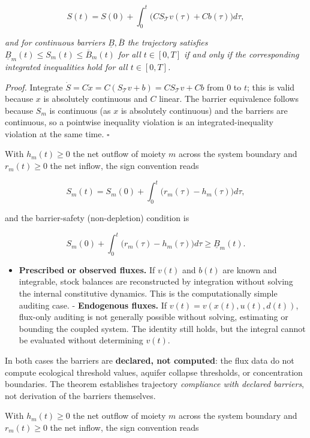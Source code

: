 \documentclass[11pt]{article}
\begin{document}
$$S(t) = S(0) + \int_0^t \bigl( C S_{\mathcal{T}} v(\tau) + Cb(\tau) \bigr) d\tau,$$

 \emph{and for continuous barriers \(\underline{B}, \overline{B}\) the trajectory satisfies \(\underline{B}_m(t) \le S_m(t) \le \overline{B}_m(t)\) for all \(t \in [0,T]\) if and only if the corresponding integrated inequalities hold for all \(t \in [0,T]\).}

\emph{Proof.} Integrate \(\dot S =\allowbreak{} C\dot x =\allowbreak{} C(S_{\mathcal{T}} v +\allowbreak{} b) =\allowbreak{} C S_{\mathcal{T}} v +\allowbreak{} Cb\) from \(0\) to \(t\); this is valid because \(x\) is absolutely continuous and \(C\) linear. The barrier equivalence follows because \(S_m\) is continuous (as \(x\) is absolutely continuous) and the barriers are continuous, so a pointwise inequality violation is an integrated-inequality violation at the same time. \(\square\)

With \(h_m(t) \ge 0\) the net outflow of moiety \(m\) across the system boundary and \(r_m(t) \ge 0\) the net inflow, the sign convention reads 

$$S_m(t) = S_m(0) + \int_0^t \bigl( r_m(\tau) - h_m(\tau) \bigr) d\tau,$$

 and the barrier-safety (non-depletion) condition is 

$$S_m(0) + \int_0^t \bigl( r_m(\tau) - h_m(\tau) \bigr) d\tau \ge \underline{B}_m(t).$$



\begin{itemize}\setlength{\itemsep}{2pt}
\item \textbf{Prescribed or observed fluxes.} If \(v(t)\) and \(b(t)\) are known and integrable, stock balances are reconstructed by integration without solving the internal constitutive dynamics. This is the computationally simple auditing case. - \textbf{Endogenous fluxes.} If \(v(t)=v(x(t),u(t),d(t))\), flux-only auditing is not generally possible without solving, estimating or bounding the coupled system. The identity still holds, but the integral cannot be evaluated without determining \(v(t)\).
\end{itemize}

In both cases the barriers are \textbf{declared, not computed}: the flux data do not compute ecological threshold values, aquifer collapse thresholds, or concentration boundaries. The theorem establishes trajectory \emph{compliance with declared barriers}, not derivation of the barriers themselves.

With \(h_m(t)\ge0\) the net outflow of moiety \(m\) across the system boundary and \(r_m(t)\ge0\) the net inflow, the sign convention reads
\end{document}
